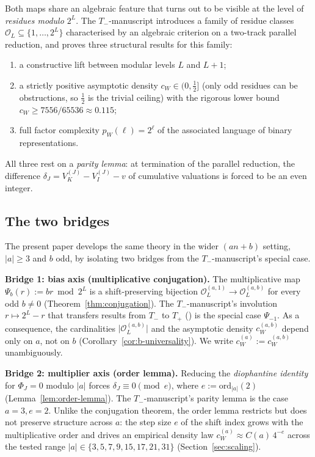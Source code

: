 \documentclass[11pt,reqno]{amsart}
\theoremstyle{plain}
\theoremstyle{definition}
\theoremstyle{remark}
\newcommand{\Tneg}{T_{-}}
\newcommand{\Tpos}{T_{+}}
\newcommand{\Obs}{\mathcal{O}}
\newcommand{\Vk}{V_{K}}
\newcommand{\Vi}{V_{I}}
\newcommand{\ord}{\mathrm{ord}}
\newcommand{\Psib}{\Psi_{b}}
\newcommand{\cWa}{c_{W}^{(a)}}
\newcommand{\cWab}{c_{W}^{(a,b)}}
\newcommand{\Obsab}{\Obs_{L}^{(a,b)}}
\begin{document}
Both maps share an algebraic feature that turns out to be visible at the
level of \emph{residues modulo $2^L$}. The $\Tneg$-manuscript
\cite{ObstructionResidues2026} introduces
a family of residue classes $\Obs_L \subseteq \{1, \ldots, 2^L\}$
characterised by an algebraic criterion on a two-track parallel
reduction, and proves three structural results for this family:
\begin{enumerate}[label=(\arabic*)]
\item a constructive lift between modular levels $L$ and $L+1$;
\item a strictly positive asymptotic density $c_W \in (0,\tfrac12]$ (only
  odd residues can be obstructions, so $\tfrac12$ is the trivial ceiling)
  with the rigorous lower bound $c_W \ge 7556/65536 \approx 0.115$;
\item full factor complexity $p_W(\ell) = 2^\ell$ of the associated
  language of binary representations.
\end{enumerate}
All three rest on a \emph{parity lemma}: at termination of the parallel
reduction, the difference $\delta_J = \Vk^{(J)} - \Vi^{(J)} - v$ of
cumulative valuations is forced to be an even integer.

\subsection{The two bridges}

The present paper develops the same theory in the wider $(an+b)$ setting,
$\lvert a \rvert \ge 3$ and $b$ odd, by isolating two bridges from the
$\Tneg$-manuscript's special case.

\medskip
\noindent\textbf{Bridge 1: bias axis (multiplicative conjugation).} The
multiplicative map $\Psib(r) := br \bmod 2^L$ is a shift-preserving
bijection $\Obs_L^{(a,1)} \to \Obsab$ for every odd $b \ne 0$
(Theorem~\ref{thm:conjugation}). The $\Tneg$-manuscript's involution $r \mapsto
2^L - r$ that transfers results from $\Tneg$ to $\Tpos$
(\cite[Section~7]{ObstructionResidues2026}) is the special case $\Psi_{-1}$.
As a consequence, the cardinalities $\lvert\Obsab\rvert$ and the
asymptotic density $\cWab$ depend only on $a$, not on $b$
(Corollary~\ref{cor:b-universality}). We write $\cWa := \cWab$
unambiguously.

\medskip
\noindent\textbf{Bridge 2: multiplier axis (order lemma).} Reducing the
\emph{diophantine identity} for $\Phi_J = 0$ modulo $\lvert a \rvert$
forces $\delta_J \equiv 0 \pmod{e}$, where $e := \ord_{\lvert a \rvert}(2)$
(Lemma~\ref{lem:order-lemma}). The $\Tneg$-manuscript's parity lemma is the
case $a = 3, e = 2$. Unlike the conjugation theorem, the order lemma
restricts but does not preserve structure across $a$: the step size $e$
of the shift index grows with the multiplicative order and drives an
empirical density law $\cWa \approx C(a)\,4^{-e}$ across the tested range
$\lvert a \rvert \in \{3, 5, 7, 9, 15, 17, 21, 31\}$
(Section~\ref{sec:scaling}).
\end{document}
